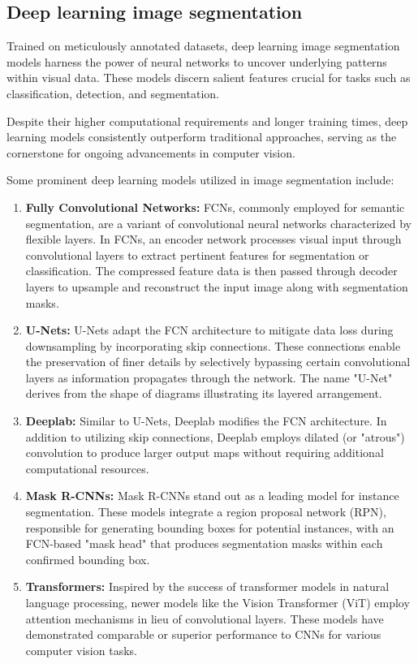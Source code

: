 \subsection{Deep learning image segmentation}
Trained on meticulously annotated datasets, deep learning image segmentation models harness the power of neural networks to uncover underlying patterns within visual data. These models discern salient features crucial for tasks such as classification, detection, and segmentation.

Despite their higher computational requirements and longer training times, deep learning models consistently outperform traditional approaches, serving as the cornerstone for ongoing advancements in computer vision.

Some prominent deep learning models utilized in image segmentation include:

\begin{enumerate}
  \item \textbf{Fully Convolutional Networks:} FCNs, commonly employed for semantic segmentation, are a variant of convolutional neural networks characterized by flexible layers. In FCNs, an encoder network processes visual input through convolutional layers to extract pertinent features for segmentation or classification. The compressed feature data is then passed through decoder layers to upsample and reconstruct the input image along with segmentation masks.
  \item \textbf{U-Nets:} U-Nets adapt the FCN architecture to mitigate data loss during downsampling by incorporating skip connections. These connections enable the preservation of finer details by selectively bypassing certain convolutional layers as information propagates through the network. The name "U-Net" derives from the shape of diagrams illustrating its layered arrangement.
  \item \textbf{Deeplab:} Similar to U-Nets, Deeplab modifies the FCN architecture. In addition to utilizing skip connections, Deeplab employs dilated (or "atrous") convolution to produce larger output maps without requiring additional computational resources.
  \item \textbf{Mask R-CNNs:} Mask R-CNNs stand out as a leading model for instance segmentation. These models integrate a region proposal network (RPN), responsible for generating bounding boxes for potential instances, with an FCN-based "mask head" that produces segmentation masks within each confirmed bounding box.
  \item \textbf{Transformers:} Inspired by the success of transformer models in natural language processing, newer models like the Vision Transformer (ViT) employ attention mechanisms in lieu of convolutional layers. These models have demonstrated comparable or superior performance to CNNs for various computer vision tasks.
\end{enumerate}


